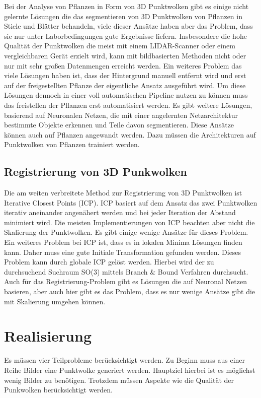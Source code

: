 \documentclass[12pt,titlepage, twoside]{article}
\begin{document}
Bei der Analyse von Pflanzen in Form von 3D Punktwolken gibt es einige nicht gelernte Lösungen \cite{ThreeBasics} \cite{RegionGrowing} die das segmentieren von 3D Punktwolken von Pflanzen in Stiele und Blätter behandeln, viele dieser Ansätze haben aber das Problem, dass sie nur unter Laborbedingungen gute Ergebnisse liefern. 
Insbesondere die hohe Qualität der Punktwolken die meist mit einem LIDAR-Scanner oder einem vergleichbaren Gerät erzielt wird, kann mit bildbasierten Methoden nicht oder nur mit sehr großen Datenmengen erreicht werden. 
Ein weiteres Problem das viele Lösungen haben ist, dass der Hintergrund manuell entfernt wird und erst auf der freigestellten Pflanze der eigentliche Ansatz ausgeführt wird. 
Um diese Lösungen dennoch in einer voll automatischen Pipeline nutzen zu können muss das freistellen der Pflanzen erst automatisiert werden.
Es gibt weitere Lösungen, basierend auf Neuronalen Netzen, die mit einer angelernten Netzarchitektur bestimmte Objekte erkennen und Teile davon segmentieren. Diese Ansätze können auch auf Pflanzen angewandt werden. Dazu müssen die Architekturen auf Punktwolken von Pflanzen trainiert werden.  

\subsection{Registrierung von 3D Punkwolken}
\label{sec:stand:registrierung}

Die am weiten verbreitete Method zur Registrierung von 3D Punktwolken ist Iterative Closest Points (ICP). ICP basiert auf dem Ansatz das zwei Punktwolken iterativ aneinander angenähert werden und bei jeder Iteration der Abstand minimiert wird.
Die meisten Implementierungen von ICP beachten aber nicht die Skalierung der Punktwolken. Es gibt einige wenige Ansätze für dieses Problem. 
Ein weiteres Problem bei ICP ist, dass es in lokalen Minima Lösungen finden kann. Daher muss eine gute Initiale Transformation gefunden werden. Dieses Problem kann durch globale ICP gelöst werden. Hierbei wird der zu durchsuchend Suchraum SO(3) mittels Branch \& Bound Verfahren durchsucht.
Auch für das Registrierung-Problem gibt es Lösungen die auf Neuronal Netzen basieren, aber auch hier gibt es das Problem, dass es nur wenige Ansätze gibt die mit Skalierung umgehen können.

\newpage
\section{Realisierung}
\label{sec:realisierung}
Es müssen vier Teilprobleme berücksichtigt werden. Zu Beginn muss aus einer Reihe Bilder eine Punktwolke generiert werden. Hauptziel hierbei ist es möglichst wenig Bilder zu benötigen. 
Trotzdem müssen Aspekte wie die Qualität der Punkwolken berücksichtigt werden. 
\end{document}
